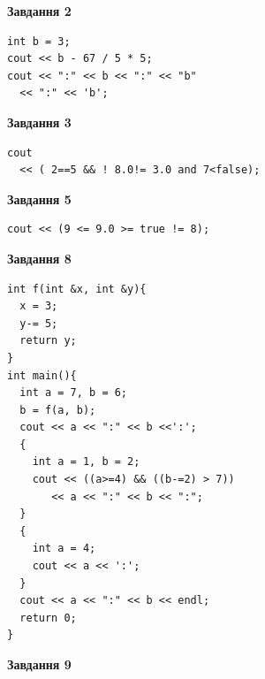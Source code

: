 \documentclass[12pt, ukrainian]{article}
\begin{document}
{\begin {large}
\begin{minipage}[t]{7.0cm}
\end{minipage}
\vline \hspace{1mm}
\begin{minipage}[t]{11.0cm}

\begin{center}
\textbf{Завдання 2}
\end{center}
\vspace{-8mm}

\begin{verbatim}
int b = 3;
cout << b - 67 / 5 * 5;
cout << ":" << b << ":" << "b" 
  << ":" << 'b';
\end{verbatim}



\begin{center}
\textbf{Завдання 3}
\end{center}
\vspace{-8mm}

\begin{verbatim}
cout 
  << ( 2==5 && ! 8.0!= 3.0 and 7<false);
\end{verbatim}



\begin{center}
\textbf{Завдання 5}
\end{center}
\vspace{-8mm}

\begin{verbatim}
cout << (9 <= 9.0 >= true != 8);
\end{verbatim}



\begin{center}
\textbf{Завдання 8}
\end{center}
\vspace{-8mm}

\begin{verbatim}
int f(int &x, int &y){
  x = 3;
  y-= 5;
  return y;
}
int main(){
  int a = 7, b = 6;
  b = f(a, b);
  cout << a << ":" << b <<':';
  {
    int a = 1, b = 2;
    cout << ((a>=4) && ((b-=2) > 7))
       << a << ":" << b << ":";
  }
  {
    int a = 4;
    cout << a << ':';
  }
  cout << a << ":" << b << endl;
  return 0;
}
\end{verbatim}

\end{minipage}


\begin{minipage}[t]{7.0cm}

\begin{center}
\textbf{Завдання 9}
\end{center}
\vspace{-8mm}


\end{minipage}
\end{large}}
\end{document}
